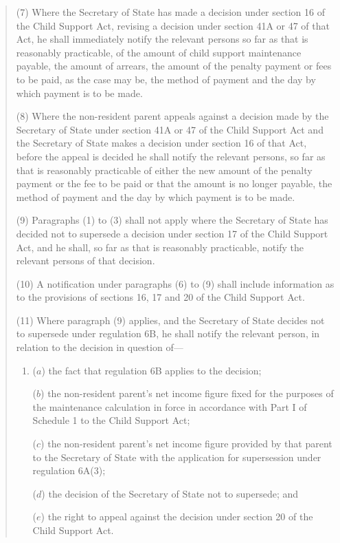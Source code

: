 \documentclass[12pt,a4paper]{article}
\begin{document}
\begin{quotation}
(7) Where the Secretary of State has made a decision under section 16 of the Child Support Act, revising a decision under section 41A or 47 of that Act, he shall immediately notify the relevant persons so far as that is reasonably practicable, of the amount of child support maintenance payable, the amount of arrears, the amount of the penalty payment or fees to be paid, as the case may be, the method of payment and the day by which payment is to be made.

(8) Where the non-resident parent appeals against a decision made by the Secretary of State under section 41A or 47 of the Child Support Act and the Secretary of State makes a decision under section 16 of that Act, before the appeal is decided he shall notify the relevant persons, so far as that is reasonably practicable of either the new amount of the penalty payment or the fee to be paid or that the amount is no longer payable, the method of payment and the day by which payment is to be made.

(9) Paragraphs (1) to (3) shall not apply where the Secretary of State has decided not to supersede a decision under section 17 of the Child Support Act, and he shall, so far as that is reasonably practicable, notify the relevant persons of that decision.

(10) A notification under paragraphs (6) to (9) shall include information as to the provisions of sections 16, 17 and 20 of the Child Support Act.

(11) Where paragraph (9) applies, and the Secretary of State decides not to supersede under regulation 6B, he shall notify the relevant person, in relation to the decision in question of—
\begin{enumerate}\item[]
($a$) the fact that regulation 6B applies to the decision;

($b$) the non-resident parent’s net income figure fixed for the purposes of the maintenance calculation in force in accordance with Part I of Schedule 1 to the Child Support Act;

($c$) the non-resident parent’s net income figure provided by that parent to the Secretary of State with the application for supersession under regulation 6A(3);

($d$) the decision of the Secretary of State not to supersede; and

($e$) the right to appeal against the decision under section 20 of the Child Support Act.
\end{enumerate}


\end{quotation}
\end{document}

